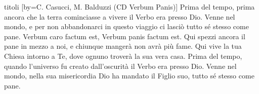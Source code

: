 \begin{songs}{titoli}
[by={C. Casucci, M. Balduzzi (CD Verbum Panis)}]
\beginverse
Prima del tempo, prima ancora che la terra cominciasse a vivere
il Verbo era presso Dio.
Venne nel mondo, e per non abbandonarci in questo viaggio ci lasciò
tutto sé stesso come pane.
\endverse
\beginchorus
Verbum caro factum est, Verbum panis factum est. 
\endchorus
\beginverse
Qui spezzi ancora il pane in mezzo a noi,
e chiunque mangerà non avrà più fame.
Qui vive la tua Chiesa intorno a Te,
dove ognuno troverà la sua vera casa.
\endverse
\beginverse
Prima del tempo, quando l'universo fu creato dall'oscurità
il Verbo era presso Dio.
Venne nel mondo, nella sua misericordia Dio ha mandato il Figlio suo,
tutto sé stesso come pane.
\endverse
\endsong

\end{songs}
